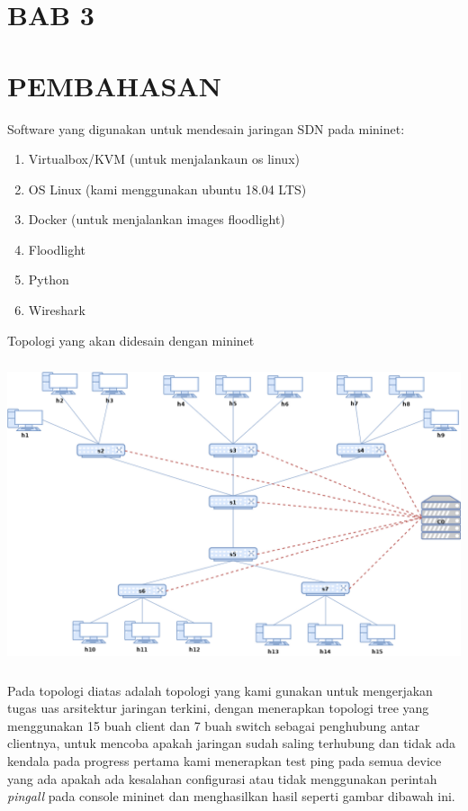 \begin{center}
\section{BAB 3}
\section{PEMBAHASAN}
\end{center}
Software yang digunakan untuk mendesain jaringan SDN pada mininet:
\liststyleLvii
\begin{enumerate}
\item Virtualbox/KVM (untuk menjalankaun os linux)
\item OS Linux (kami menggunakan ubuntu 18.04 LTS)
\item Docker (untuk menjalankan images floodlight)
\item Floodlight
\item Python
\item Wireshark
\end{enumerate}

Topologi yang akan didesain dengan mininet
\begin{center}
\includegraphics[width=5.5925in,height=3.5091in]{gambar/topologi.png}
\end{center}

Pada topologi diatas adalah topologi yang kami gunakan untuk mengerjakan tugas uas arsitektur jaringan terkini,
dengan menerapkan topologi tree yang menggunakan 15 buah client dan 7 buah switch sebagai penghubung antar clientnya,
untuk mencoba apakah jaringan sudah saling terhubung dan tidak ada kendala pada progress pertama kami menerapkan test
ping pada semua device yang ada apakah ada kesalahan configurasi atau tidak menggunakan perintah \textit{pingall }pada
console mininet dan menghasilkan hasil seperti gambar dibawah ini.


